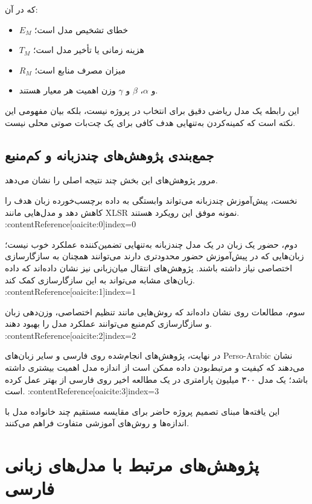 که در آن:

\begin{itemize}
    \item $E_M$ خطای تشخیص مدل است؛
    \item $T_M$ هزینه زمانی یا تأخیر مدل است؛
    \item $R_M$ میزان مصرف منابع است؛
    \item و $\alpha$، $\beta$ و $\gamma$ وزن اهمیت هر معیار هستند.
\end{itemize}

این رابطه یک مدل ریاضی دقیق برای انتخاب در پروژه نیست، بلکه
بیان مفهومی این نکته است که کمینه‌کردن  به‌تنهایی هدف کافی
برای یک چت‌بات صوتی محلی نیست.


\subsection{جمع‌بندی پژوهش‌های چندزبانه و کم‌منبع}

مرور پژوهش‌های این بخش چند نتیجه اصلی را نشان می‌دهد.

نخست، پیش‌آموزش چندزبانه می‌تواند وابستگی به داده برچسب‌خورده
زبان هدف را کاهش دهد و مدل‌هایی مانند XLSR نمونه موفق این
رویکرد هستند. :contentReference[oaicite:0]{index=0}

دوم، حضور یک زبان در یک مدل چندزبانه به‌تنهایی تضمین‌کننده
عملکرد خوب نیست؛ زبان‌هایی که در پیش‌آموزش حضور محدودتری دارند
می‌توانند همچنان به سازگار‌سازی اختصاصی نیاز داشته باشند.
پژوهش‌های انتقال میان‌زبانی نیز نشان داده‌اند که داده زبان‌های
مشابه می‌تواند به این سازگار‌سازی کمک کند. :contentReference[oaicite:1]{index=1}

سوم، مطالعات روی  نشان داده‌اند که روش‌هایی مانند
تنظیم اختصاصی، وزن‌دهی زبان و سازگار‌سازی کم‌منبع می‌توانند
عملکرد مدل را بهبود دهند. :contentReference[oaicite:2]{index=2}

در نهایت، پژوهش‌های انجام‌شده روی فارسی و سایر زبان‌های
Perso-Arabic نشان می‌دهند که کیفیت و مرتبط‌بودن داده ممکن است
از اندازه مدل اهمیت بیشتری داشته باشد؛ یک مدل ۳۰۰ میلیون
پارامتری در یک مطالعه اخیر روی فارسی از 
بهتر عمل کرده است. :contentReference[oaicite:3]{index=3}

این یافته‌ها مبنای تصمیم پروژه حاضر برای مقایسه مستقیم چند
خانواده مدل با اندازه‌ها و روش‌های آموزشی متفاوت فراهم می‌کنند.
\section{پژوهش‌های مرتبط با مدل‌های زبانی فارسی}

